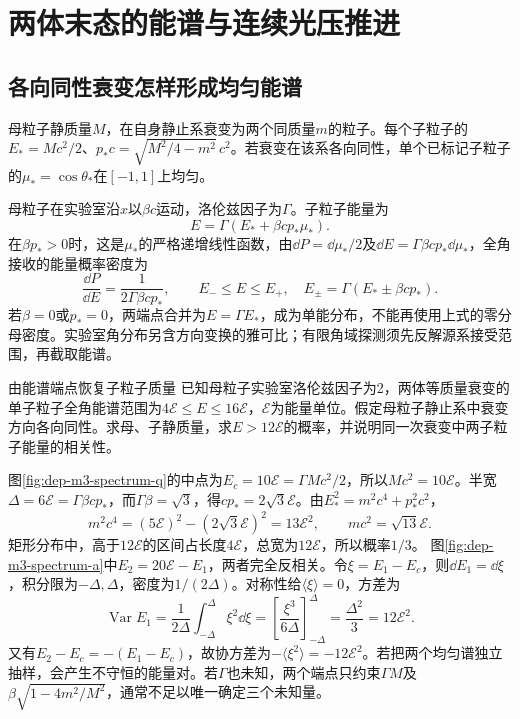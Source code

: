\section{两体末态的能谱与连续光压推进}
\subsection{各向同性衰变怎样形成均匀能谱}
母粒子静质量$M$，在自身静止系衰变为两个同质量$m$的粒子。每个子粒子的$E_*=Mc^2/2$、$p_*c=\sqrt{M^2/4-m^2}\,c^2$。若衰变在该系各向同性，单个已标记子粒子的$\mu_*=\cos\theta_*$在$[-1,1]$上均匀。

母粒子在实验室沿$x$以$\beta c$运动，洛伦兹因子为$\Gamma$。子粒子能量为
\[
 E=\Gamma(E_*+\beta cp_*\mu_*).
\]
在$\beta p_*>0$时，这是$\mu_*$的严格递增线性函数，由$\dd P=\dd\mu_*/2$及$\dd E=\Gamma\beta cp_*\dd\mu_*$，全角接收的能量概率密度为
\[
 \frac{\dd P}{\dd E}=\frac1{2\Gamma\beta cp_*},\qquad
 E_-\leq E\leq E_+,\quad
 E_\pm=\Gamma(E_*\pm\beta cp_*).
\]
若$\beta=0$或$p_*=0$，两端点合并为$E=\Gamma E_*$，成为单能分布，不能再使用上式的零分母密度。实验室角分布另含方向变换的雅可比；有限角域探测须先反解源系接受范围，再截取能谱。

\begin{example}由能谱端点恢复子粒子质量
已知母粒子实验室洛伦兹因子为2，两体等质量衰变的单子粒子全角能谱范围为$4\mathcal E\leq E\leq16\mathcal E$，$\mathcal E$为能量单位。假定母粒子静止系中衰变方向各向同性。求母、子静质量，求$E>12\mathcal E$的概率，并说明同一次衰变中两子粒子能量的相关性。
\end{example}
\begin{solution}
图\ref{fig:dep-m3-spectrum-q}的中点为$E_c=10\mathcal E=\Gamma Mc^2/2$，所以$Mc^2=10\mathcal E$。半宽$\Delta=6\mathcal E=\Gamma\beta cp_*$，而$\Gamma\beta=\sqrt3$，得$cp_*=2\sqrt3\mathcal E$。由$E_*^2=m^2c^4+p_*^2c^2$，
\[
 m^2c^4=(5\mathcal E)^2-(2\sqrt3\mathcal E)^2
 =13\mathcal E^2,\qquad mc^2=\sqrt{13}\mathcal E.
\]
矩形分布中，高于$12\mathcal E$的区间占长度$4\mathcal E$，总宽为$12\mathcal E$，所以概率$1/3$。
图\ref{fig:dep-m3-spectrum-a}中$E_2=20\mathcal E-E_1$，两者完全反相关。令$\xi=E_1-E_c$，则$\dd E_1=\dd\xi$，积分限为$-\Delta,\Delta$，密度为$1/(2\Delta)$。对称性给$\langle\xi\rangle=0$，方差为
\[
 \operatorname{Var}E_1=\frac1{2\Delta}\int_{-\Delta}^{\Delta}\xi^2\dd\xi
 =\left[\frac{\xi^3}{6\Delta}\right]_{-\Delta}^{\Delta}
 =\frac{\Delta^2}{3}=12\mathcal E^2.
\]
又有$E_2-E_c=-(E_1-E_c)$，故协方差为$-\langle\xi^2\rangle=-12\mathcal E^2$。若把两个均匀谱独立抽样，会产生不守恒的能量对。若$\Gamma$也未知，两个端点只约束$\Gamma M$及$\beta\sqrt{1-4m^2/M^2}$，通常不足以唯一确定三个未知量。
\end{solution}

